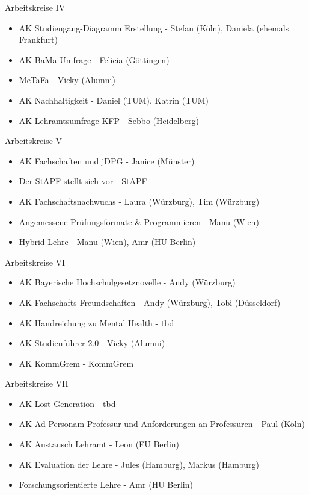 \begin{frame}{Arbeitskreise IV}
	\begin{itemize}
		\item AK Studiengang-Diagramm Erstellung - Stefan (Köln), Daniela (ehemals Frankfurt)
		\item AK BaMa-Umfrage - Felicia (Göttingen)
		\item MeTaFa - Vicky (Alumni)
		\item AK Nachhaltigkeit - Daniel (TUM), Katrin (TUM)
		\item AK Lehramtsumfrage KFP - Sebbo (Heidelberg)

	\end{itemize}
\end{frame}

\begin{frame}{Arbeitskreise V}
	\begin{itemize}
		\item AK Fachschaften und jDPG - Janice (Münster)
		\item Der StAPF stellt sich vor - StAPF
		\item AK Fachschaftsnachwuchs - Laura (Würzburg), Tim (Würzburg) 
		\item Angemessene Prüfungsformate \& Programmieren - Manu (Wien) 
		\item Hybrid Lehre - Manu (Wien), Amr (HU Berlin)
	\end{itemize}
\end{frame}

\begin{frame}{Arbeitskreise VI}
	\begin{itemize}
		\item AK Bayerische Hochschulgesetznovelle - Andy (Würzburg) 
		\item AK Fachschafts-Freundschaften - Andy (Würzburg), Tobi (Düsseldorf)
		\item AK Handreichung zu Mental Health - tbd 
		\item AK Studienführer 2.0 - Vicky (Alumni) 
		\item AK KommGrem - KommGrem 
	\end{itemize}
\end{frame}

\begin{frame}{Arbeitskreise VII}
	\begin{itemize}
		\item AK Lost Generation - tbd
		\item AK Ad Personam Professur und Anforderungen an Professuren - Paul (Köln)
		\item AK Austausch Lehramt - Leon (FU Berlin)
		\item AK Evaluation der Lehre - Jules (Hamburg), Markus (Hamburg)
		\item Forschungsorientierte Lehre - Amr (HU Berlin)
	\end{itemize}
\end{frame}

